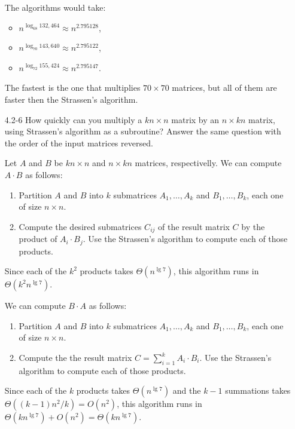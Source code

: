 \documentclass{report}
\makeatletter
\renewenvironment{framed}{%
 \def\FrameCommand##1{\hskip\@totalleftmargin
 \fboxsep=\FrameSep\fbox{##1}}%
 \MakeFramed {\advance\hsize-\width
   \@totalleftmargin\z@ \linewidth\hsize
   \@setminipage}}%
 {\par\unskip\endMakeFramed}
\makeatother
\begin{document}
\begin{enumerate}
\begin{framed}
The algorithms would take:
\begin{itemize}
  \item $n^{\log_{68} 132,464} \approx n^{2.795128}$,
  \item $n^{\log_{70} 143,640} \approx n^{2.795122}$,
  \item $n^{\log_{72} 155,424} \approx n^{2.795147}$.
\end{itemize}

The fastest is the one that multiplies $70 \times 70$ matrices, but all of them
are faster then the Strassen's algorithm.
\end{framed}

\item[4.2{-}6]{How quickly can you multiply a $k n \times n$ matrix by an
$n \times k n$ matrix, using Strassen's algorithm as a subroutine? Answer the
same question with the order of the input matrices reversed.}

\begin{framed}
Let $A$ and $B$ be $kn \times n$ and $n \times k n$ matrices, respectivelly. We
can compute $A \cdot B$ as follows:
\begin{enumerate}
\item Partition $A$ and $B$ into $k$ submatrices $A_1, \dots, A_k$ and $B_1,
\dots, B_k$, each one of size $n \times n$.
\item Compute the desired submatrices $C_{ij}$ of the result matrix $C$ by the
product of $A_i \cdot B_j$. Use the Strassen's algorithm to compute each of
those products.
\end{enumerate}

Since each of the $k^2$ products takes $\Theta(n^{\lg 7})$, this algorithm
runs in $\Theta(k^2 n^{\lg 7})$.

We can compute $B \cdot A$ as follows:
\begin{enumerate}
\item Partition $A$ and $B$ into $k$ submatrices $A_1, \dots, A_k$ and $B_1,
\dots, B_k$, each one of size $n \times n$.
\item Compute the the result matrix $C = \sum_{i = 1}^{k} A_i \cdot B_i$.
Use the Strassen's algorithm to compute each of those products.
\end{enumerate}

Since each of the $k$ products takes $\Theta(n^{\lg 7})$ and the $k - 1$
summations takes $\Theta((k - 1) {n^2}/k) = O(n^2)$, this algorithm runs in
$\Theta(k n^{\lg 7}) + O(n^2) = \Theta(k n^{\lg 7})$.


\end{framed}
\end{enumerate}
\end{document}

